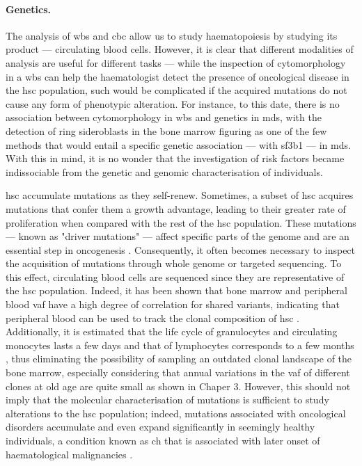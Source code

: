 \paragraph{Genetics.} The analysis of \ac{wbs} and \ac{cbc} allow us to study haematopoiesis by studying its product --- circulating blood cells. However, it is clear that different modalities of analysis are useful for different tasks --- while the inspection of cytomorphology in a \ac{wbs} can help the haematologist detect the presence of oncological disease in the \ac{hsc} population, such would be complicated if the acquired mutations do not cause any form of phenotypic alteration. For instance, to this date, there is no association between cytomorphology in \ac{wbs} and genetics in \ac{mds}, with the detection of ring sideroblasts in the bone marrow figuring as one of the few methods that would entail a specific genetic association --- with \ac{sf3b1} --- in \ac{mds}. With this in mind, it is no wonder that the investigation of risk factors became indissociable from the genetic and genomic characterisation of individuals.

\Ac{hsc} accumulate mutations as they self-renew. Sometimes, a subset of \ac{hsc} acquires mutations that confer them a growth advantage, leading to their greater rate of proliferation when compared with the rest of the \ac{hsc} population. These mutations --- known as "driver mutations" --- affect specific parts of the genome and are an essential step in oncogenesis \cite{Stratton2009-id}. Consequently, it often becomes necessary to inspect the acquisition of mutations through whole genome or targeted sequencing. To this effect, circulating blood cells are sequenced since they are representative of the \ac{hsc} population. Indeed, it has been shown that bone marrow and peripheral blood \ac{vaf} have a high degree of correlation for shared variants, indicating that peripheral blood can be used to track the clonal composition of \ac{hsc} \cite{Patkar2018-lp,Tong2015-oq,Coffey2019-rr}. Additionally, it is estimated that the life cycle of granulocytes and circulating monocytes lasts a few days and that of lymphocytes corresponds to a few months \cite{Resegotti1957-ut,Lahoz-Beneytez2016-zq,Patel2017-qx}, thus eliminating the possibility of sampling an outdated clonal landscape of the bone marrow, especially considering that annual variations in the \ac{vaf} of different clones at old age are quite small as shown in Chaper 3. However, this should not imply that the molecular characterisation of mutations is sufficient to study alterations to the \ac{hsc} population; indeed, mutations associated with oncological disorders accumulate and even expand significantly in seemingly healthy individuals, a condition known as \ac{ch} that is associated with later onset of haematological malignancies \cite{Jaiswal2014-rl}. 

